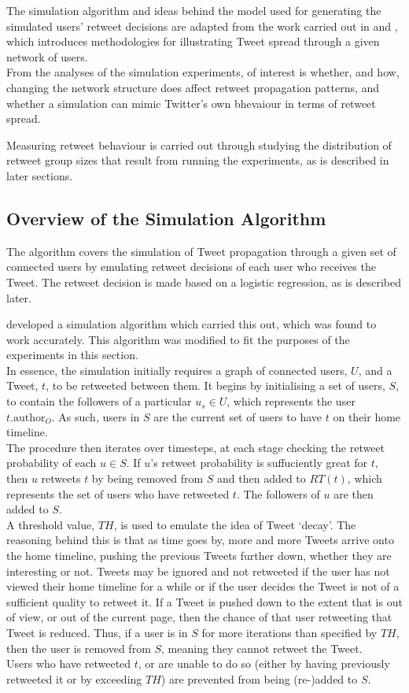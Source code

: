 The simulation algorithm and ideas behind the model used for generating the simulated users' retweet decisions are adapted from the work carried out in \cite{zhu11} and \cite{peng11}, which introduces methodologies for illustrating Tweet spread through a given network of users.\\
From the analyses of the simulation experiments, of interest is whether, and how, changing the network structure does affect retweet propagation patterns, and whether a simulation can mimic Twitter's own bhevaiour in terms of retweet spread.

Measuring retweet behaviour is carried out through studying the distribution of retweet group sizes that result from running the experiments, as is described in later sections.


\subsection{Overview of the Simulation Algorithm}
The algorithm covers the simulation of Tweet propagation through a given set of connected users by emulating retweet decisions of each user who receives the Tweet. The retweet decision is made based on a logistic regression, as is described later.

\cite{zhu11} developed a simulation algorithm which carried this out, which was found to work accurately. This algorithm was modified to fit the purposes of the experiments in this section.\\
In essence, the simulation initially requires a graph of connected users, $U$, and a Tweet, $t$, to be retweeted between them. It begins by initialising a set of users, $S$, to contain the followers of a particular $u_s \in U$, which represents the user $t.\textrm{author}_O$. As such, users in $S$ are the current set of users to have $t$ on their home timeline.\\
The procedure then iterates over timesteps, at each stage checking the retweet probability of each $u \in S$. If $u$'s retweet probability is suffuciently great for $t$, then $u$ retweets $t$ by being removed from $S$ and then added to $RT(t)$, which represents the set of users who have retweeted $t$. The followers of $u$ are then added to $S$.\\
A threshold value, $TH$, is used to emulate the idea of Tweet `decay'. The reasoning behind this is that as time goes by, more and more Tweets arrive onto the home timeline, pushing the previous Tweets further down, whether they are interesting or not. Tweets may be ignored and not retweeted if the user has not viewed their home timeline for a while or if the user decides the Tweet is not of a sufficient quality to retweet it. If a Tweet is pushed down to the extent that is out of view, or out of the current page, then the chance of that user retweeting that Tweet is reduced. Thus, if a user is in $S$ for more iterations than specified by $TH$, then the user is removed from $S$, meaning they cannot retweet the Tweet.\\
Users who have retweeted $t$, or are unable to do so (either by having previously retweeted it or by exceeding $TH$) are prevented from being (re-)added to $S$.

